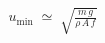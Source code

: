 \documentclass[preview]{standalone}
\begin{document}
\begin{align*}
u_{\min} \;\simeq\; \sqrt{\frac{m\,g}{\rho\,A\,f}}
\end{align*}
\end{document}
